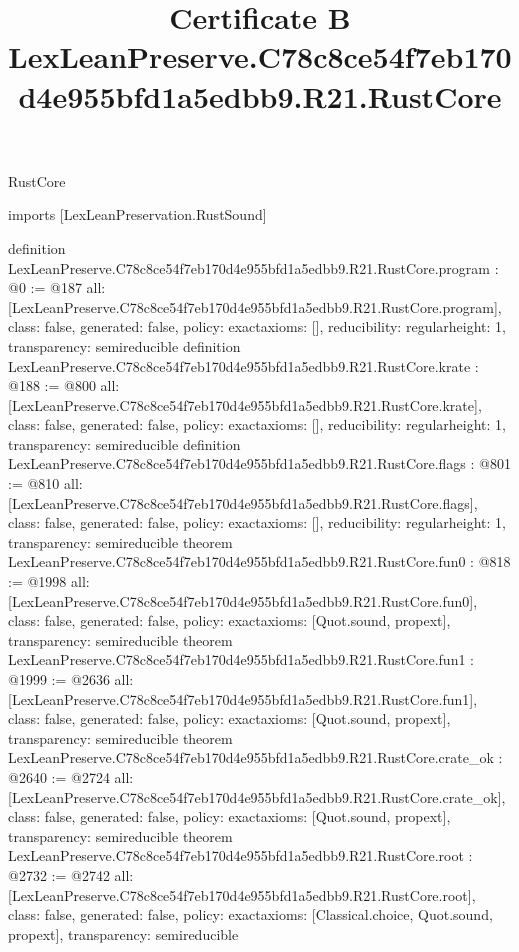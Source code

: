 \begin{lexlean}{RustCore}
\title{Certificate B LexLeanPreserve.C78c8ce54f7eb170d4e955bfd1a5edbb9.R21.RustCore}
\begin{coremodule}
imports [LexLeanPreservation.RustSound]

definition LexLeanPreserve.C78c8ce54f7eb170d4e955bfd1a5edbb9.R21.RustCore.program : @0 := @187 {
  all: [LexLeanPreserve.C78c8ce54f7eb170d4e955bfd1a5edbb9.R21.RustCore.program],
  class: false,
  generated: false,
  policy: exact{axioms: []},
  reducibility: regular{height: 1},
  transparency: semireducible
}
definition LexLeanPreserve.C78c8ce54f7eb170d4e955bfd1a5edbb9.R21.RustCore.krate : @188 := @800 {
  all: [LexLeanPreserve.C78c8ce54f7eb170d4e955bfd1a5edbb9.R21.RustCore.krate],
  class: false,
  generated: false,
  policy: exact{axioms: []},
  reducibility: regular{height: 1},
  transparency: semireducible
}
definition LexLeanPreserve.C78c8ce54f7eb170d4e955bfd1a5edbb9.R21.RustCore.flags : @801 := @810 {
  all: [LexLeanPreserve.C78c8ce54f7eb170d4e955bfd1a5edbb9.R21.RustCore.flags],
  class: false,
  generated: false,
  policy: exact{axioms: []},
  reducibility: regular{height: 1},
  transparency: semireducible
}
theorem LexLeanPreserve.C78c8ce54f7eb170d4e955bfd1a5edbb9.R21.RustCore.fun0 : @818 := @1998 {
  all: [LexLeanPreserve.C78c8ce54f7eb170d4e955bfd1a5edbb9.R21.RustCore.fun0],
  class: false,
  generated: false,
  policy: exact{axioms: [Quot.sound, propext]},
  transparency: semireducible
}
theorem LexLeanPreserve.C78c8ce54f7eb170d4e955bfd1a5edbb9.R21.RustCore.fun1 : @1999 := @2636 {
  all: [LexLeanPreserve.C78c8ce54f7eb170d4e955bfd1a5edbb9.R21.RustCore.fun1],
  class: false,
  generated: false,
  policy: exact{axioms: [Quot.sound, propext]},
  transparency: semireducible
}
theorem LexLeanPreserve.C78c8ce54f7eb170d4e955bfd1a5edbb9.R21.RustCore.crate_ok : @2640 := @2724 {
  all: [LexLeanPreserve.C78c8ce54f7eb170d4e955bfd1a5edbb9.R21.RustCore.crate_ok],
  class: false,
  generated: false,
  policy: exact{axioms: [Quot.sound, propext]},
  transparency: semireducible
}
theorem LexLeanPreserve.C78c8ce54f7eb170d4e955bfd1a5edbb9.R21.RustCore.root : @2732 := @2742 {
  all: [LexLeanPreserve.C78c8ce54f7eb170d4e955bfd1a5edbb9.R21.RustCore.root],
  class: false,
  generated: false,
  policy: exact{axioms: [Classical.choice, Quot.sound, propext]},
  transparency: semireducible
}


\end{coremodule}
\end{lexlean}
